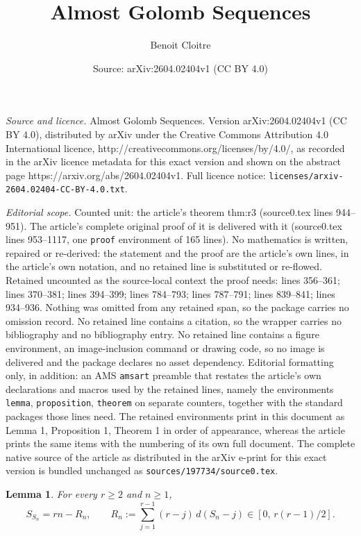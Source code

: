 \documentclass[10pt,a4paper]{amsart}
\title{Almost Golomb Sequences}
\author{Benoit Cloitre}
\date{Source: arXiv:2604.02404v1 (CC BY 4.0)}
\newtheorem{lemma}{Lemma}
\begin{document}
\maketitle

\noindent\emph{Source and licence.} Almost Golomb Sequences. Version arXiv:2604.02404v1 (CC BY 4.0), distributed by arXiv under the Creative Commons Attribution 4.0 International licence, http://creativecommons.org/licenses/by/4.0/, as recorded in the arXiv licence metadata for this exact version and shown on the abstract page https://arxiv.org/abs/2604.02404v1. Full licence notice: \texttt{licenses/arxiv-2604.02404-CC-BY-4.0.txt}.\par\smallskip

\noindent\textit{Editorial scope.} Counted unit: the article's theorem thm:r3 (source0.tex lines 944--951). The article's complete original proof of it is delivered with it (source0.tex lines 953--1117, one \texttt{proof} environment of 165 lines). No mathematics is written, repaired or re-derived: the statement and the proof are the article's own lines, in the article's own notation, and no retained line is substituted or re-flowed.  Retained uncounted as the source-local context the proof needs: lines 356--361; lines 370--381; lines 394--399; lines 784--793; lines 787--791; lines 839--841; lines 934--936.  Nothing was omitted from any retained span, so the package carries no omission record.  No retained line contains a citation, so the wrapper carries no bibliography and no bibliography entry.  No retained line contains a figure environment, an image-inclusion command or drawing code, so no image is delivered and the package declares no asset dependency.  Editorial formatting only, in addition: an AMS \texttt{amsart} preamble that restates the article's own declarations and macros used by the retained lines, namely the environments \texttt{lemma}, \texttt{proposition}, \texttt{theorem} on separate counters, together with the standard packages those lines need.  The retained environments print in this document as Lemma 1, Proposition 1, Theorem 1 in order of appearance, whereas the article prints the same items with the numbering of its own full document.  The complete native source of the article as distributed in the arXiv e-print for this exact version is bundled unchanged as \texttt{sources/197734/source0.tex}.
\begin{lemma}\label{lem:nested-anchor}
For every $r\ge 2$ and $n\ge 1$,
\[
  S_{S_n}=rn-R_n, \qquad R_n:=\sum_{j=1}^{r-1}(r-j)\,d(S_n-j)\in[0,\,r(r-1)/2].
\]
\end{lemma}
\end{document}
